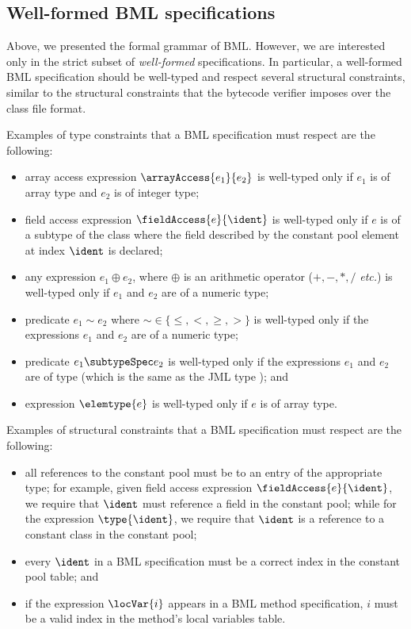 \subsection{Well-formed BML specifications}
Above, we presented the formal grammar of BML.  However, we are
interested only in the strict subset of \emph{well-formed}
specifications. In particular, a well-formed BML specification should
be well-typed and respect several structural constraints, similar to
the structural constraints that the bytecode verifier imposes over the
class file format.

Examples of type constraints that a BML specification must
respect are the following:
\begin{itemize}
\item array access expression
$\arrayAccess{e_1}{e_2}$ is well-typed only if $e_1$ is of array
type and $e_2$ is of integer type;

\item field access expression
    $\fieldAccess{e}{\ident}$ is well-typed only if $e$ is
    of a subtype of the class where the field described by the constant
    pool element at index $\ident$ is declared;

\item any  expression $ e_1 \oplus e_2$, where \(\oplus\) is an arithmetic 
operator (\(+,-,*,/\) \emph{etc.}) is well-typed only if $e_1$ and $
e_2$ are of a numeric type;
    
\item predicate $e_1 \sim e_2$ where $\sim \in \{\leq,<,\geq,
>\}$ is well-typed only if the expressions $e_1$ and $e_2$ are of a 
numeric type;

\item predicate $e_1 \subtypeSpec e_2$ is well-typed only if the 
expressions $e_1$ and $e_ 2$ are of type 
(which is the same as the JML type \TYPE); and

\item expression $\elemtype{e}$ is well-typed only if $e$ is of array type.

	  
\end{itemize}

Examples of structural constraints that a BML specification must
respect are the following: 
\begin{itemize}
\item all references to the constant pool must be to an entry of the
appropriate type; for example, given field access expression
$\fieldAccess{e}{\ident}$, we require that $\ident$ must reference a
field in the constant pool; while for the expression $\type{\ident}$,
we require that \(\ident\) is a reference to a constant class in the
constant pool;
    
\item every $\ident$ in a BML specification must be a correct
index in the constant pool table; and
    
\item if the expression $\locVar{i}$ appears in a BML method 
specification, $i$ must be a valid index in the method's local
variables table.
\end{itemize}

